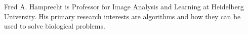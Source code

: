 \begin{IEEEbiography}%
{Fred A. Hamprecht} is Professor for Image Analysis and Learning at Heidelberg University. His primary research interests are algorithms and how they can be used to solve biological problems. 
\end{IEEEbiography}

